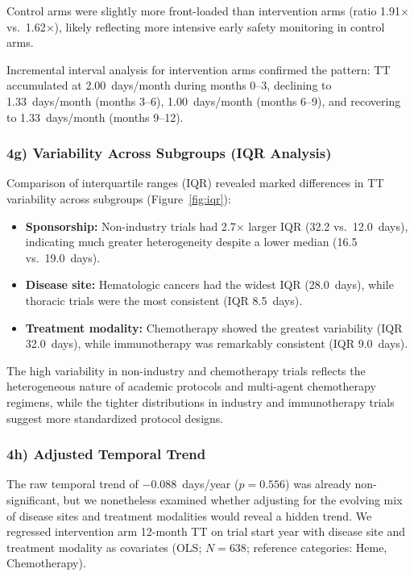 \documentclass[11pt,a4paper]{article}
\begin{document}
Control arms were slightly more front-loaded than intervention arms (ratio 1.91$\times$ vs.\ 1.62$\times$), likely reflecting more intensive early safety monitoring in control arms.

Incremental interval analysis for intervention arms confirmed the pattern: TT accumulated at 2.00~days/month during months 0--3, declining to 1.33~days/month (months 3--6), 1.00~days/month (months 6--9), and recovering to 1.33~days/month (months 9--12).

\subsubsection{4g) Variability Across Subgroups (IQR Analysis)}

Comparison of interquartile ranges (IQR) revealed marked differences in TT variability across subgroups (Figure~\ref{fig:iqr}):

\begin{itemize}
    \item \textbf{Sponsorship:} Non-industry trials had 2.7$\times$ larger IQR (32.2 vs.\ 12.0~days), indicating much greater heterogeneity despite a lower median (16.5 vs.\ 19.0~days).
    \item \textbf{Disease site:} Hematologic cancers had the widest IQR (28.0~days), while thoracic trials were the most consistent (IQR 8.5~days).
    \item \textbf{Treatment modality:} Chemotherapy showed the greatest variability (IQR 32.0~days), while immunotherapy was remarkably consistent (IQR 9.0~days).
\end{itemize}

The high variability in non-industry and chemotherapy trials reflects the heterogeneous nature of academic protocols and multi-agent chemotherapy regimens, while the tighter distributions in industry and immunotherapy trials suggest more standardized protocol designs.

\subsubsection{4h) Adjusted Temporal Trend}

The raw temporal trend of $-0.088$~days/year ($p=0.556$) was already non-significant, but we nonetheless examined whether adjusting for the evolving mix of disease sites and treatment modalities would reveal a hidden trend. We regressed intervention arm 12-month TT on trial start year with disease site and treatment modality as covariates (OLS; $N=638$; reference categories: Heme, Chemotherapy).
\end{document}
